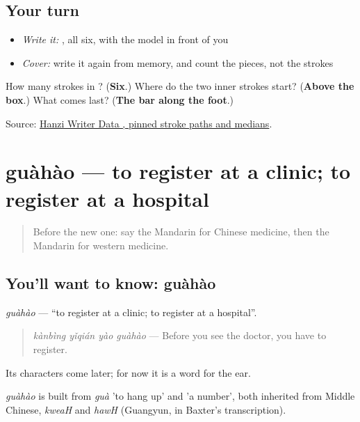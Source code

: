 \subsection*{Your turn}
\begin{itemize}
\raggedright
  \item \emph{Write it:} , all six, with the model in front of you
  \item \emph{Cover:} write it again from memory, and count the pieces, not the strokes
\end{itemize}

\begin{tcolorbox}[breakable,colback=teal!4,colframe=teal!35!black,title={Before you move on}]
How many strokes in ? (\textbf{Six}.) Where do the two inner strokes start? (\textbf{Above the box}.) What comes last? (\textbf{The bar along the foot}.)

Source: \href{https://raw.githubusercontent.com/chanind/hanzi-writer-data/68d10a4b21150cae5e1ebbd223eed289cf32d90c/data/\%E8\%A5\%BF.json}{Hanzi Writer Data , pinned stroke paths and medians}.
\end{tcolorbox}
\section[guàhào]{guàhào — to register at a clinic; to register at a hospital}

\label{lesson:ZH-C231-guahao}



\begin{quote}
Before the new one: say the Mandarin for Chinese medicine, then the Mandarin for western medicine.
\end{quote}

\subsection*{You'll want to know: guàhào}
\emph{guàhào} — \textquotedblleft{}to register at a clinic; to register at a hospital\textquotedblright{}.

\begin{quote}
\emph{kànbìng yǐqián yào guàhào} — Before you see the doctor, you have to register.
\end{quote}

Its characters come later; for now it is a word for the ear.

\begin{cousinweb}
\emph{guàhào} is built from \emph{guà} 'to hang up' and  'a number', both inherited from Middle Chinese, \emph{kweaH} and \emph{hawH} (Guangyun, in Baxter's transcription).
\end{cousinweb}

